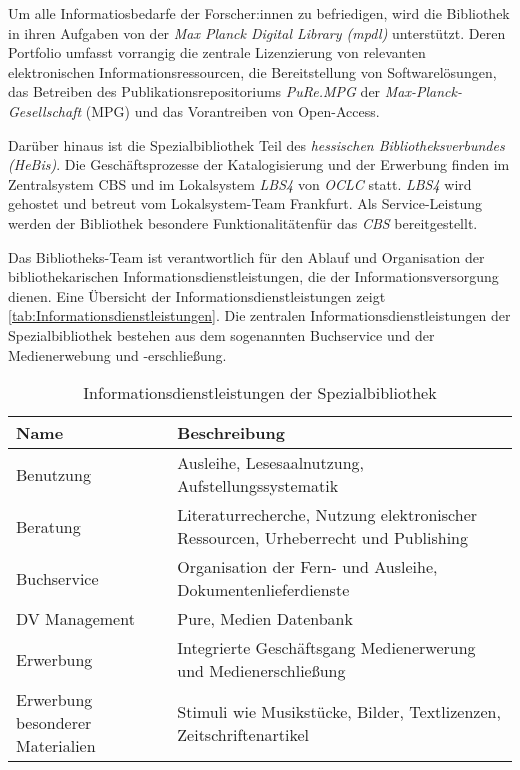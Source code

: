 Um alle Informatiosbedarfe der Forscher:innen zu befriedigen, wird die Bibliothek in ihren Aufgaben von der
\textit{Max Planck Digital Library ({mpdl})} unterstützt. Deren Portfolio umfasst vorrangig die zentrale 
Lizenzierung von relevanten elektronischen Informationsressourcen, die Bereitstellung von Softwarelösungen, 
das Betreiben des Publikationsrepositoriums \textit{PuRe.MPG} der \textit{Max-Planck-Gesellschaft} (MPG) und
das Vorantreiben von Open-Access. 

Darüber hinaus ist die Spezialbibliothek Teil des \textit{hessischen Bibliotheksverbundes (HeBis)}. 
Die Geschäftsprozesse der Katalogisierung und der Erwerbung finden im Zentralsystem \acrlong{CBS} und 
im Lokalsystem \textit{LBS4} von \textit{OCLC} statt. \textit{LBS4} wird gehostet und betreut vom Lokalsystem-Team Frankfurt. 
Als Service-Leistung werden der Bibliothek besondere Funktionalitätenfür das \textit{CBS} bereitgestellt.

Das Bibliotheks-Team ist verantwortlich für den Ablauf und Organisation der bibliothekarischen Informationsdienstleistungen, 
die der Informationsversorgung dienen. Eine Übersicht der Informationsdienstleistungen zeigt \autoref{tab:Informationsdienstleistungen}.
Die zentralen Informationsdienstleistungen der Spezialbibliothek bestehen aus dem sogenannten Buchservice und der Medienerwebung und -erschließung. 
\begingroup
\setlength{\tabcolsep}{12pt} %
\renewcommand{\arraystretch}{1.5} 
\begin{table}[h]
    \centering
    \begin{adjustbox}{max width=\textwidth}
    \begin{tabular}{p{}p{}}
       \toprule
       \textbf{Name}& \textbf{Beschreibung}\\
       \midrule
        Benutzung                               &Ausleihe, Lesesaalnutzung, Aufstellungssystematik\\
        Beratung                                &Literaturrecherche, Nutzung elektronischer Ressourcen, Urheberrecht und Publishing\\
        Buchservice                             &Organisation der Fern- und Ausleihe, Dokumentenlieferdienste\\
        DV Management                           &Pure, Medien Datenbank\\
        Erwerbung                               &Integrierte Geschäftsgang Medienerwerung und Medienerschließung\\
        Erwerbung besonderer Materialien        &Stimuli wie Musikstücke, Bilder, Textlizenzen, Zeitschriftenartikel\\       
       \bottomrule
    \end{tabular}
    \end{adjustbox}
    \caption{%
        Informationsdienstleistungen der Spezialbibliothek
    }
    \label{tab:Informationsdienstleistungen}
    \end{table}
\endgroup


